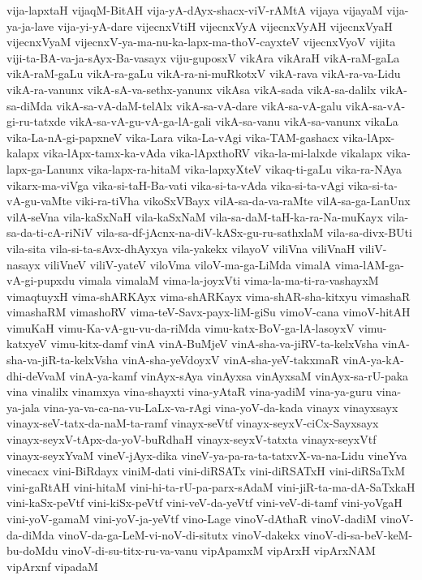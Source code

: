 {vija-lapxtaH
vijaqM-BitAH
vija-yA-dAyx-shacx-viV-rAMtA
vijaya
vijayaM
vija-ya-ja-lave
vija-yi-yA-dare
vijecnxVtiH
vijecnxVyA
vijecnxVyAH
vijecnxVyaH
vijecnxVyaM
vijecnxV-ya-ma-nu-ka-lapx-ma-thoV-cayxteV
vijecnxVyoV
vijita
viji-ta-BA-va-ja-sAyx-Ba-vasayx
viju-guposxV
vikAra
vikAraH
vikA-raM-gaLa
vikA-raM-gaLu
vikA-ra-gaLu
vikA-ra-ni-muRkotxV
vikA-rava
vikA-ra-va-Lidu
vikA-ra-vanunx
vikA-sA-va-sethx-yanunx
vikAsa
vikA-sada
vikA-sa-dalilx
vikA-sa-diMda
vikA-sa-vA-daM-telAlx
vikA-sa-vA-dare
vikA-sa-vA-galu
vikA-sa-vA-gi-ru-tatxde
vikA-sa-vA-gu-vA-ga-lA-gali
vikA-sa-vanu
vikA-sa-vanunx
vikaLa
vika-La-nA-gi-papxneV
vika-Lara
vika-La-vAgi
vika-TAM-gashacx
vika-lApx-kalapx
vika-lApx-tamx-ka-vAda
vika-lApxthoRV
vika-la-mi-lalxde
vikalapx
vika-lapx-ga-Lanunx
vika-lapx-ra-hitaM
vika-lapxyXteV
vikaq-ti-gaLu
vika-ra-NAya
vikarx-ma-viVga
vika-si-taH-Ba-vati
vika-si-ta-vAda
vika-si-ta-vAgi
vika-si-ta-vA-gu-vaMte
viki-ra-tiVha
vikoSxVBayx
vilA-sa-da-va-raMte
vilA-sa-ga-LanUnx
vilA-seVna
vila-kaSxNaH
vila-kaSxNaM
vila-sa-daM-taH-ka-ra-Na-muKayx
vila-sa-da-ti-cA-riNiV
vila-sa-df-jAcnx-na-diV-kASx-gu-ru-sathxlaM
vila-sa-divx-BUti
vila-sita
vila-si-ta-sAvx-dhAyxya
vila-yakekx
vilayoV
viliVna
viliVnaH
viliV-nasayx
viliVneV
viliV-yateV
viloVma
viloV-ma-ga-LiMda
vimalA
vima-lAM-ga-vA-gi-pupxdu
vimala
vimalaM
vima-la-joyxVti
vima-la-ma-ti-ra-vashayxM
vimaqtuyxH
vima-shARKAyx
vima-shARKayx
vima-shAR-sha-kitxyu
vimashaR
vimashaRM
vimashoRV
vima-teV-Savx-payx-liM-giSu
vimoV-cana
vimoV-hitAH
vimuKaH
vimu-Ka-vA-gu-vu-da-riMda
vimu-katx-BoV-ga-lA-lasoyxV
vimu-katxyeV
vimu-kitx-damf
vinA
vinA-BuMjeV
vinA-sha-va-jiRV-ta-kelxVsha
vinA-sha-va-jiR-ta-kelxVsha
vinA-sha-yeVdoyxV
vinA-sha-yeV-takxmaR
vinA-ya-kA-dhi-deVvaM
vinA-ya-kamf
vinAyx-sAya
vinAyxsa
vinAyxsaM
vinAyx-sa-rU-paka
vina
vinalilx
vinamxya
vina-shayxti
vina-yAtaR
vina-yadiM
vina-ya-guru
vina-ya-jala
vina-ya-va-ca-na-vu-LaLx-va-rAgi
vina-yoV-da-kada
vinayx
vinayxsayx
vinayx-seV-tatx-da-naM-ta-ramf
vinayx-seVtf
vinayx-seyxV-ciCx-Sayxsayx
vinayx-seyxV-tApx-da-yoV-buRdhaH
vinayx-seyxV-tatxta
vinayx-seyxVtf
vinayx-seyxYvaM
vineV-jAyx-dika
vineV-ya-pa-ra-ta-tatxvX-va-na-Lidu
vineYva
vinecacx
vini-BiRdayx
viniM-dati
vini-diRSATx
vini-diRSATxH
vini-diRSaTxM
vini-gaRtAH
vini-hitaM
vini-hi-ta-rU-pa-parx-sAdaM
vini-jiR-ta-ma-dA-SaTxkaH
vini-kaSx-peVtf
vini-kiSx-peVtf
vini-veV-da-yeVtf
vini-veV-di-tamf
vini-yoVgaH
vini-yoV-gamaM
vini-yoV-ja-yeVtf
vino-Lage
vinoV-dAthaR
vinoV-dadiM
vinoV-da-diMda
vinoV-da-ga-LeM-vi-noV-di-situtx
vinoV-dakekx
vinoV-di-sa-beV-keM-bu-doMdu
vinoV-di-su-titx-ru-va-vanu
vipApamxM
vipArxH
vipArxNAM
vipArxnf
vipadaM
}

